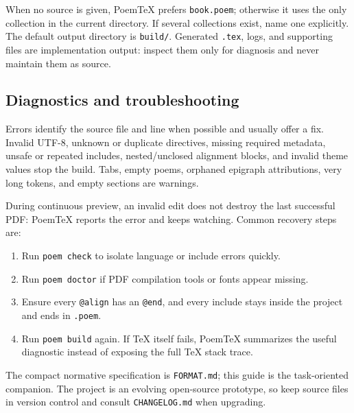 \documentclass[11pt,a4paper]{article}
\makeatletter
\newcommand{\code}[1]{\texttt{#1}}
\newcommand{\directive}[1]{\texttt{@#1}}
\makeatother
\begin{document}
When no source is given, PoemTeX prefers \code{book.poem}; otherwise it uses the
only collection in the current directory. If several collections exist, name
one explicitly. The default output directory is \code{build/}. Generated
\code{.tex}, logs, and supporting files are implementation output: inspect them
only for diagnosis and never maintain them as source.

\subsection{Diagnostics and troubleshooting}

Errors identify the source file and line when possible and usually offer a fix.
Invalid UTF-8, unknown or duplicate directives, missing required metadata,
unsafe or repeated includes, nested/unclosed alignment blocks, and invalid
theme values stop the build. Tabs, empty poems, orphaned epigraph attributions,
very long tokens, and empty sections are warnings.

During continuous preview, an invalid edit does not destroy the last successful
PDF: PoemTeX reports the error and keeps watching. Common recovery steps are:

\begin{enumerate}
  \item Run \code{poem check} to isolate language or include errors quickly.
  \item Run \code{poem doctor} if PDF compilation tools or fonts appear missing.
  \item Ensure every \directive{align} has an \directive{end}, and every include
        stays inside the project and ends in \code{.poem}.
  \item Run \code{poem build} again. If TeX itself fails, PoemTeX summarizes the
        useful diagnostic instead of exposing the full TeX stack trace.
\end{enumerate}

The compact normative specification is \code{FORMAT.md}; this guide is the
task-oriented companion. The project is an evolving open-source prototype, so
keep source files in version control and consult \code{CHANGELOG.md} when
upgrading.
\end{document}
